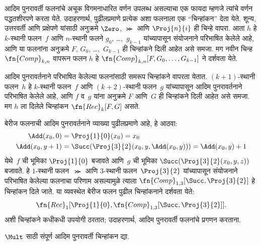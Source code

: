 \documentclass[../../../include/open-logic-section]{subfiles}
\begin{document}

आदिम पुनरावर्ती फलनांचे अचूक विगमनाधारित वर्णन उपलब्ध असल्याचा एक फायदा
म्हणजे त्यांचे वर्णन पद्धतशीरपणे करता येते. उदाहरणार्थ, पुढीलप्रमाणे
प्रत्येक अशा फलनाला एक ``चिन्हांकन'' देता येते. शून्य, उत्तरवर्ती आणि
प्रक्षेपणे यांसाठी अनुक्रमे $\Zero$, $\Succ$ आणि $\Proj{n}{i}$ ही चिन्हे
वापरा. आता $h$ हे $k$-स्थानी फलन~$f$ आणि $n$-स्थानी फलने $g_0$,
\dots,~$g_{k-1}$ यांच्यापासून संयोजनाने परिभाषित केलेले आहे, आणि या
फलनांना अनुक्रमे $F$, $G_0$, \dots,~$G_{k-1}$ ही चिन्हांकने दिली आहेत
असे समजा. मग नवीन चिन्ह $\fn{Comp}_{k,n}$ वापरून फलन $h$ हे
$\fn{Comp}_{k,n}[F,G_0,\dots,G_{k-1}]$ ने दर्शवता येते.

आदिम पुनरावर्तनाने परिभाषित केलेल्या फलनांसाठी समरूप चिन्हांकने वापरता
येतात. $(k+1)$-स्थानी फलन~$h$ हे $k$-स्थानी फलन~$f$ आणि $(k+2)$-स्थानी
फलन~$g$ यांच्यापासून आदिम पुनरावर्तनाने परिभाषित केलेले आहे, आणि $f$
व~$g$ यांना अनुक्रमे $F$ आणि~$G$ ही चिन्हांकने दिली आहेत असे समजा. मग
$h$ ला दिलेले चिन्हांकन $\fn{Rec}_k[F,G]$ असते.

बेरीज फलनाची आदिम पुनरावर्तनाने व्याख्या पुढीलप्रमाणे आहे, हे आठवा:
\begin{align*}
  \Add(x_0, 0) & = \Proj{1}{0}(x_0) = x_0\\
  \Add(x_0, y+1) & = \Succ(\Proj{3}{2}(x_0, y, \Add(x_0, y))) = \Add(x_0, y) +1
\end{align*}
येथे~$f$ ची भूमिका $\Proj{1}{0}$ बजावते आणि~$g$ ची भूमिका
$\Succ(\Proj{3}{2}(x_0, y, z))$ बजावते. हे $1$-स्थानी फलन~$\Succ$
आणि $3$-स्थानी फलन~$\Proj{3}{2}$ यांच्यापासून संयोजनाने परिभाषित
केलेल्या फलनाचा परिणाम असल्यामुळे त्याला
$\fn{Comp}_{1,3}[\Succ,\Proj{3}{2}]$ हे चिन्हांकन दिले जाते. या
व्यवस्थेत बेरीज फलन पुढील चिन्हांकनाने दर्शवता येते:
\[
\fn{Rec}_1[\Proj{1}{0},\fn{Comp}_{1,3}[\Succ,\Proj{3}{2}]].
\]
अशी चिन्हांकने कधीकधी उपयोगी ठरतात; उदाहरणार्थ, आदिम पुनरावर्ती फलनांचे
प्रगणन करताना.

\begin{prob}
  $\Mult$ साठी संपूर्ण आदिम पुनरावर्ती चिन्हांकन द्या.
\end{prob}
\end{document}

